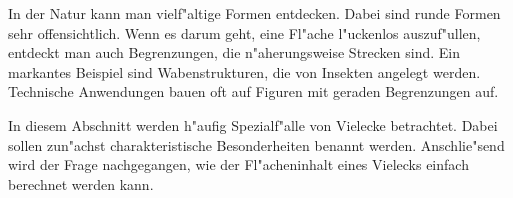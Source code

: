 



\begin{MIntro}
In der Natur kann man vielf"altige Formen entdecken. Dabei sind runde Formen
sehr offensichtlich.  Wenn es darum geht, eine Fl"ache l"uckenlos auszuf"ullen, 
entdeckt man auch Begrenzungen, die n"aherungsweise Strecken sind. Ein markantes
Beispiel sind Wabenstrukturen, die von Insekten angelegt werden.
Technische Anwendungen bauen oft auf Figuren mit geraden Begrenzungen auf.

In diesem Abschnitt werden h"aufig Spezialf"alle von Vielecke betrachtet. 
Dabei sollen zun"achst charakteristische Besonderheiten benannt werden.
Anschlie"send wird der Frage nachgegangen, wie der Fl"acheninhalt eines 
Vielecks einfach berechnet werden kann. 
\end{MIntro}



